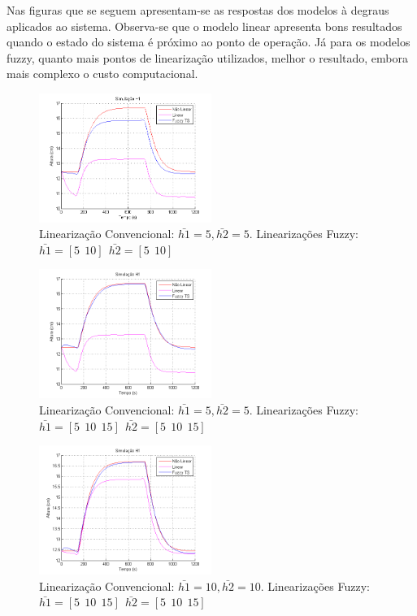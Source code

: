 Nas figuras que se seguem apresentam-se as respostas dos modelos à degraus aplicados ao sistema.  Observa-se que o modelo linear apresenta bons resultados quando o estado do sistema é próximo ao ponto de operação. Já para os modelos fuzzy, quanto mais pontos de linearização utilizados, melhor o resultado, embora mais complexo o custo computacional.

\begin{figure}[H]
	\includegraphics[width=0.5\textwidth]{img/h1Fuz5_10.png}
	\caption{\small Linearização Convencional: $ \bar{h1}=5, \bar{h2}=5$. Linearizações Fuzzy: $\bar{h1}=[5 \ \ 10] \ \ \bar{h2}=[5 \ \ 10]$ }
	\label{figH1FNM_1}
\end{figure}

\begin{figure}[H]
	\includegraphics[width=0.5\textwidth]{img/h1Fuz5_10_15.png}
	\caption{\small Linearização Convencional: $ \bar{h1}=5, \bar{h2}=5$. Linearizações Fuzzy: $\bar{h1}=[5 \ \ 10 \ \ 15] \ \ \bar{h2}=[5 \ \ 10 \ \ 15]$ }
	\label{figH1FNM_2}
\end{figure}

\begin{figure}[H]
	\includegraphics[width=0.5\textwidth]{img/h1conv10.png}
	\caption{\small Linearização Convencional: $ \bar{h1}=10, \bar{h2}=10$. Linearizações Fuzzy: $\bar{h1}=[5 \ \ 10 \ \ 15] \ \ \bar{h2}=[5 \ \ 10 \ \ 15]$ }
	\label{figH1FNM_3}
\end{figure}

